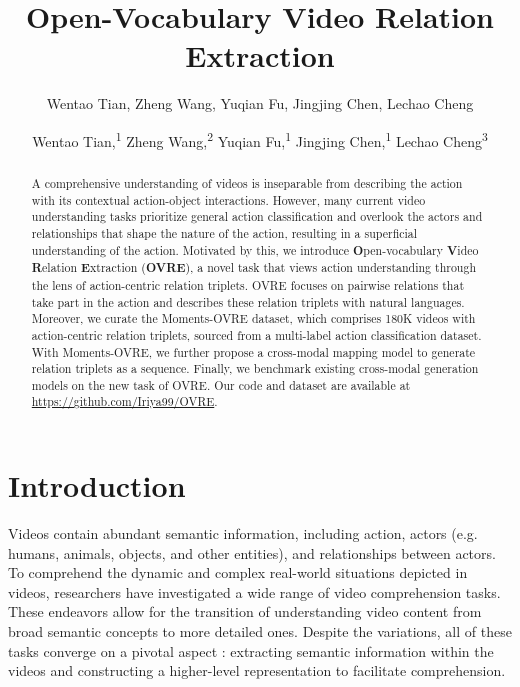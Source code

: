 \documentclass[letterpaper]{article}
\title{Open-Vocabulary Video Relation Extraction}
\author{
Wentao Tian, Zheng Wang, Yuqian Fu, Jingjing Chen, Lechao Cheng
}
\author {
    Wentao Tian,\textsuperscript{\rm 1}
    Zheng Wang,\textsuperscript{\rm 2} \equalcontrib
    Yuqian Fu,\textsuperscript{\rm 1}
    Jingjing Chen,\textsuperscript{\rm 1}\equalcontrib
    Lechao Cheng\textsuperscript{\rm 3}
}
\begin{document}
\maketitle
\begin{abstract}
A comprehensive understanding of videos is inseparable from describing the action with its contextual action-object interactions. However, many current video understanding tasks prioritize general action classification and overlook the actors and relationships that shape the nature of the action, resulting in a superficial understanding of the action.
Motivated by this, we introduce \textbf{O}pen-vocabulary  \textbf{V}ideo \textbf{R}elation \textbf{E}xtraction (\textbf{OVRE}), a novel task that views action understanding through the lens of action-centric relation triplets. OVRE focuses on pairwise relations that take part in the action and describes these relation triplets with natural languages. Moreover, we curate the Moments-OVRE dataset, which comprises 180K videos with action-centric relation triplets, sourced from a multi-label action classification dataset. With Moments-OVRE, we further propose a cross-modal mapping model to generate relation triplets as a sequence. Finally, we benchmark existing cross-modal generation models on the new task of OVRE. Our code and dataset are available at
\url{https://github.com/Iriya99/OVRE}.

\end{abstract}

\section{Introduction}
Videos contain abundant semantic information, including action, actors (e.g. humans, animals, objects, and other entities), and relationships between actors.
To comprehend the dynamic and complex real-world situations depicted in videos, researchers have investigated a wide range of video comprehension tasks.
These endeavors allow for the transition of understanding video content from broad semantic concepts to more detailed ones. %
Despite the variations, all of these tasks converge on a pivotal aspect
: extracting semantic information within the videos and constructing a higher-level representation to facilitate comprehension.
\end{document}
